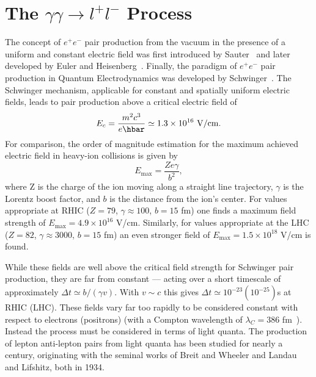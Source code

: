 \documentclass[twocolumn,epjc3]{svjour3}\sloppy
\begin{document}
\section{The $\gamma\gamma \rightarrow l^+l^-$ Process}
\label{sec:process}
The concept of $e^+e^-$ pair production from the vacuum in the presence of a uniform and constant electric field was first introduced by Sauter~\cite{sauterUeberVerhaltenElektrons1931} and later developed by Euler and Heisenberg~\cite{heisenbergFolgerungenAusDiracschen1936}. Finally, the paradigm of $e^+e^-$ pair production in Quantum Electrodynamics was developed by Schwinger~\cite{schwingerGaugeInvarianceVacuum1951}. The Schwinger mechanism, applicable for constant and spatially uniform electric fields, leads to pair production above a critical electric field of
\begin{equation}
E_c = \frac{m^2c^3}{e\hbar}  \simeq 1.3\times 10^{16}\ {\rm V/cm}.
\end{equation}
For comparison, the order of magnitude estimation for the maximum achieved electric field in heavy-ion collisions is given by\cite{baurCoherentPhotonphotonInteractions2009}
\begin{equation}
    E_\mathrm{max} = \frac{Ze\gamma}{b^2},
\end{equation}
where Z is the charge of the ion moving along a straight line trajectory, $\gamma$ is the Lorentz boost factor, and $b$ is the distance from the ion's center. For values appropriate at RHIC ($Z=79$, $\gamma\approx100$, $b=15$ fm) one finds a maximum field strength of $E_\mathrm{max}=4.9 \times 10^{16}$ V/cm. Similarly, for values appropriate at the LHC ($Z=82$, $\gamma\approx3000$, $b=15$ fm) an even stronger field of $E_\mathrm{max}=1.5\times10^{18}$ V/cm is found. 

While these fields are well above the critical field strength for Schwinger pair production, they are far from constant --- acting over a short timescale of approximately $\Delta t \simeq b/(\gamma v)$. With $v\sim c$ this gives $\Delta t\simeq10^{-23} (10^{-25})$s at RHIC (LHC). These fields vary far too rapidly to be considered constant with respect to electrons (positrons) (with a Compton wavelength of $\lambda_{C} = 386$ fm~\cite{henckenImpactparameterDependenceTotal1995}). Instead the process must be considered in terms of light quanta. The production of lepton anti-lepton pairs from light quanta has been studied for nearly a century, originating with the seminal works of Breit and Wheeler\cite{breitCollisionTwoLight1934} and Landau and Lifshitz\cite{landauCreationElectronsPositrons1934}, both in 1934.
\end{document}
